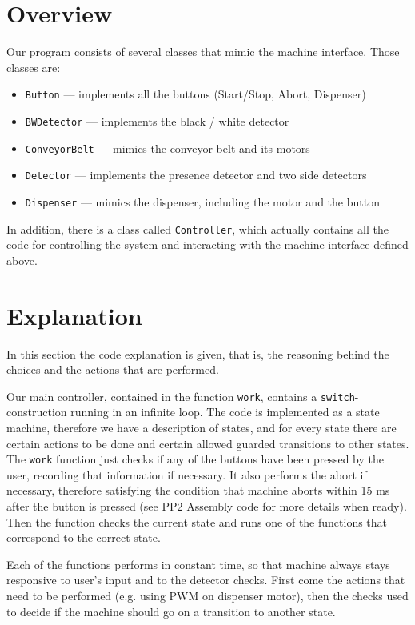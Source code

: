 \documentclass[a4paper,oneside,11pt]{report}
\begin{document}
\section{Overview}
Our program consists of several classes that mimic the machine interface. Those classes are:
\begin{itemize}
\item \texttt{Button} --- implements all the buttons (Start/Stop, Abort, Dispenser)
\item \texttt{BWDetector} --- implements the black / white detector
\item \texttt{ConveyorBelt} --- mimics the conveyor belt and its motors
\item \texttt{Detector} --- implements the presence detector and two side detectors
\item \texttt{Dispenser} --- mimics the dispenser, including the motor and the button
\end{itemize}
In addition, there is a class called \texttt{Controller}, which actually contains all the code for controlling the system and interacting with the machine interface defined above.

\section{Explanation}
In this section the code explanation is given, that is, the reasoning behind the choices and the actions that are performed.

Our main controller, contained in the function \texttt{work}, contains a \texttt{switch}-construction running in an infinite loop. The code is implemented as a state machine, therefore we have a description of states, and for every state there are certain actions to be done and certain allowed guarded transitions to other states. The \texttt{work} function just checks if any of the buttons have been pressed by the user, recording that information if necessary. It also performs the abort if necessary, therefore satisfying the condition that machine aborts within 15 ms after the button is pressed (see PP2 Assembly code for more details when ready). Then the function checks the current state and runs one of the functions that correspond to the correct state.

Each of the functions performs in constant time, so that machine always stays responsive to user's input and to the detector checks. First come the actions that need to be performed (e.g. using PWM on dispenser motor), then the checks used to decide if the machine should go on a transition to another state.
\end{document}
